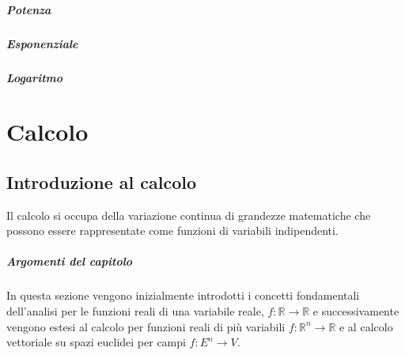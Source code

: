 \documentclass[letterpaper,10pt,italian]{jupyterBook}
\begin{document}
\subsubsection{Potenza}
\label{\detokenize{ch/algebra/complex-algebra-notes:potenza}}\label{\detokenize{ch/algebra/complex-algebra-notes:math-hs-algebra-complex-notes-fun-power}}

\subsubsection{Esponenziale}
\label{\detokenize{ch/algebra/complex-algebra-notes:esponenziale}}\label{\detokenize{ch/algebra/complex-algebra-notes:math-hs-algebra-complex-notes-fun-exp}}

\subsubsection{Logaritmo}
\label{\detokenize{ch/algebra/complex-algebra-notes:logaritmo}}\label{\detokenize{ch/algebra/complex-algebra-notes:math-hs-algebra-complex-notes-fun-log}}
\sphinxstepscope


\part{Calcolo}

\sphinxstepscope




\chapter{Introduzione al calcolo}
\label{\detokenize{ch/calculus:introduzione-al-calcolo}}\label{\detokenize{ch/calculus:math-hs-calculus}}\label{\detokenize{ch/calculus::doc}}
\sphinxAtStartPar
Il calcolo si occupa della variazione continua di grandezze matematiche che possono essere rappresentate come funzioni di variabili indipendenti.
\subsubsection*{Argomenti del capitolo}

\sphinxAtStartPar
In questa sezione vengono inizialmente introdotti i concetti fondamentali dell’analisi per le funzioni reali di una variabile reale, \(f: \mathbb{R} \rightarrow \mathbb{R}\) e successivamente vengono estesi al calcolo per funzioni reali di più variabili \(f: \mathbb{R}^n \rightarrow \mathbb{R}\) e al calcolo vettoriale su spazi euclidei per campi \(f: E^n \rightarrow V\).
\end{document}
